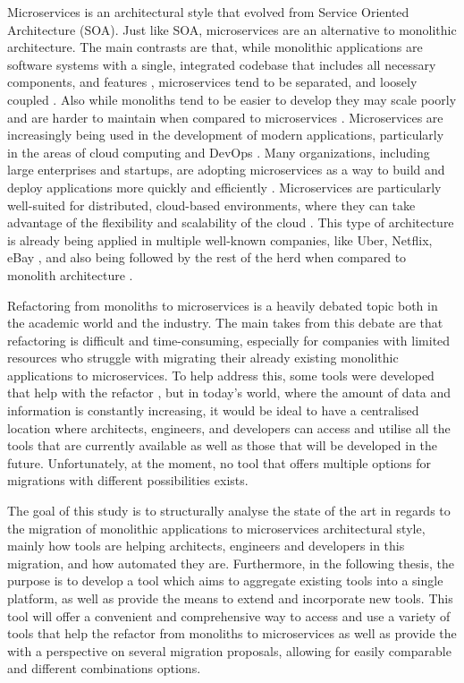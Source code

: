 \documentclass[conference]{IEEEtran}
\begin{document}
Microservices is an architectural style that evolved from Service Oriented
Architecture (SOA). Just like SOA, microservices are an alternative to
monolithic architecture. The main contrasts are that, while monolithic
applications are software systems with a single, integrated codebase that
includes all necessary components, and features
\cite{kazanavivcius2019migrating}, microservices tend to be separated, and
loosely coupled \cite{newman2021building}. Also while monoliths tend to be
easier to develop they may scale poorly and are harder to maintain when
compared to microservices \cite{newman2019monolith}. Microservices are
increasingly being used in the development of modern applications, particularly
in the areas of cloud computing and DevOps \cite{ren2018migrating}. Many
organizations, including large enterprises and startups, are adopting
microservices as a way to build and deploy applications more quickly and
efficiently \cite{richardson-microservices}. Microservices are particularly
well-suited for distributed, cloud-based environments, where they can take
advantage of the flexibility and scalability of the cloud
\cite{fowler-microservices-prerequisites}. This type of architecture is already
being applied in multiple well-known companies, like Uber, Netflix, eBay
\cite{microservices-users}, and also being followed by the rest of the herd
when compared to monolith architecture \cite{taibi2017processes}.

Refactoring from monoliths to microservices is a heavily debated topic both in
the academic world and the industry. The main takes from this debate are that
refactoring is difficult and time-consuming, especially for companies with
limited resources who struggle with migrating their already existing monolithic
applications to microservices. To help address this, some tools were developed
that help with the refactor , but in today's world, where the
amount of data and information is constantly increasing, it would be ideal to
have a centralised location where architects, engineers, and developers can
access and utilise all the tools that are currently available as well as those
that will be developed in the future. Unfortunately, at the moment, no tool
that offers multiple options for migrations with different possibilities
exists.

The goal of this study is to structurally analyse the state of the art in
regards to the migration of monolithic applications to microservices
architectural style, mainly how tools are helping architects, engineers and
developers in this migration, and how automated they are. Furthermore, in the
following thesis, the purpose is to develop a tool which aims to aggregate
existing tools into a single platform, as well as provide the means to extend
and incorporate new tools. This tool will offer a convenient and comprehensive
way to access and use a variety of tools that help the refactor from monoliths
to microservices as well as provide the with a perspective on several migration
proposals, allowing for easily comparable and different combinations options.
\end{document}
